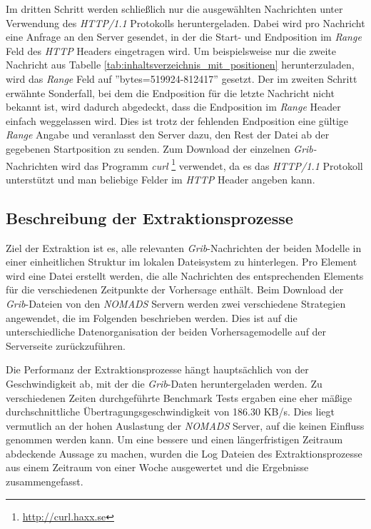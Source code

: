 Im dritten Schritt werden schließlich nur die ausgewählten Nachrichten
unter Verwendung des \textit{HTTP/1.1} Protokolls
heruntergeladen. Dabei wird pro Nachricht eine Anfrage an den Server
gesendet, in der die Start- und Endposition im \textit{Range} Feld des
\textit{HTTP} Headers eingetragen wird. Um beispielsweise nur die
zweite Nachricht aus Tabelle
\ref{tab:inhaltsverzeichnis_mit_positionen} herunterzuladen, wird das
\textit{Range} Feld auf ''bytes=519924-812417'' gesetzt. Der im
zweiten Schritt erwähnte Sonderfall, bei dem die Endposition für die
letzte Nachricht nicht bekannt ist, wird dadurch abgedeckt, dass die
Endposition im \textit{Range} Header einfach weggelassen wird. Dies
ist trotz der fehlenden Endposition eine gültige \textit{Range} Angabe
und veranlasst den Server dazu, den Rest der Datei ab der gegebenen
Startposition zu senden. Zum Download der einzelnen
\textit{Grib-}Nachrichten wird das Programm \textit{curl}
\footnote{\url{http://curl.haxx.se}} verwendet, da es das
\textit{HTTP/1.1} Protokoll unterstützt und man beliebige Felder im
\textit{HTTP} Header angeben kann.

\subsection{Beschreibung der Extraktionsprozesse}
Ziel der Extraktion ist es, alle relevanten \textit{Grib}-Nachrichten
der beiden Modelle in einer einheitlichen Struktur im lokalen
Dateisystem zu hinterlegen. Pro Element wird eine Datei erstellt
werden, die alle Nachrichten des entsprechenden Elements für die
verschiedenen Zeitpunkte der Vorhersage enthält. Beim Download der
\textit{Grib}-Dateien von den \textit{NOMADS} Servern werden zwei
verschiedene Strategien angewendet, die im Folgenden beschrieben
werden. Dies ist auf die unterschiedliche Datenorganisation der beiden
Vorhersagemodelle auf der Serverseite zurückzuführen.

Die Performanz der Extraktionsprozesse hängt hauptsächlich von der
Geschwindigkeit ab, mit der die \textit{Grib}-Daten heruntergeladen
werden. Zu verschiedenen Zeiten durchgeführte Benchmark Tests ergaben
eine eher mäßige durchschnittliche Übertragungsgeschwindigkeit von
186.30 KB/s. Dies liegt vermutlich an der hohen Auslastung der
\textit{NOMADS} Server, auf die keinen Einfluss genommen werden
kann. Um eine bessere und einen längerfristigen Zeitraum abdeckende
Aussage zu machen, wurden die Log Dateien des Extraktionsprozesse aus
einem Zeitraum von einer Woche ausgewertet und die Ergebnisse
zusammengefasst.

